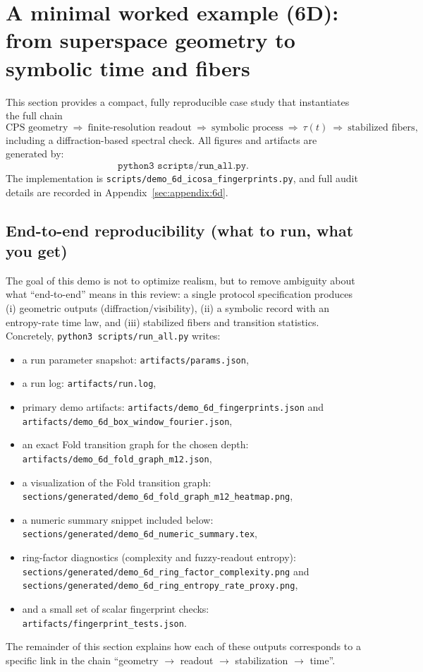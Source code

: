 \section{A minimal worked example (6D): from superspace geometry to symbolic time and fibers}\label{sec:worked-example}

This section provides a compact, fully reproducible case study that instantiates the full chain
\[
\text{CPS geometry}\ \Rightarrow\ \text{finite-resolution readout}\ \Rightarrow\ \text{symbolic process}\ \Rightarrow\ \tau(t)\ \Rightarrow\ \text{stabilized fibers},
\]
including a diffraction-based spectral check. All figures and artifacts are generated by:
\[
\texttt{python3 scripts/run\_all.py}.
\]
The implementation is \texttt{scripts/demo\_6d\_icosa\_fingerprints.py}, and full audit details are recorded in Appendix~\ref{sec:appendix:6d}.

\subsection{End-to-end reproducibility (what to run, what you get)}
The goal of this demo is not to optimize realism, but to remove ambiguity about what ``end-to-end'' means in this review: a single protocol specification produces (i) geometric outputs (diffraction/visibility), (ii) a symbolic record with an entropy-rate time law, and (iii) stabilized fibers and transition statistics.
Concretely, \texttt{python3 scripts/run\_all.py} writes:
\begin{itemize}[leftmargin=*,itemsep=2pt]
  \item a run parameter snapshot: \texttt{artifacts/params.json},
  \item a run log: \texttt{artifacts/run.log},
  \item primary demo artifacts: \texttt{artifacts/demo\_6d\_fingerprints.json} and \texttt{artifacts/demo\_6d\_box\_window\_fourier.json},
  \item an exact Fold transition graph for the chosen depth: \texttt{artifacts/demo\_6d\_fold\_graph\_m12.json},
  \item a visualization of the Fold transition graph: \texttt{sections/generated/demo\_6d\_fold\_graph\_m12\_heatmap.png},
  \item a numeric summary snippet included below: \texttt{sections/generated/demo\_6d\_numeric\_summary.tex},
  \item ring-factor diagnostics (complexity and fuzzy-readout entropy): \texttt{sections/generated/demo\_6d\_ring\_factor\_complexity.png} and \texttt{sections/generated/demo\_6d\_ring\_entropy\_rate\_proxy.png},
  \item and a small set of scalar fingerprint checks: \texttt{artifacts/fingerprint\_tests.json}.
\end{itemize}
The remainder of this section explains how each of these outputs corresponds to a specific link in the chain ``geometry $\to$ readout $\to$ stabilization $\to$ time''.

